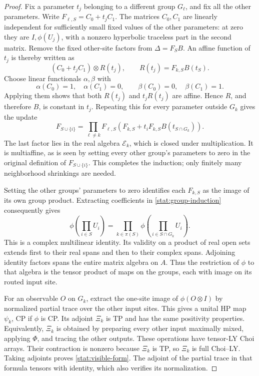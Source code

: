 \documentclass[reqno]{amsart}
\theoremstyle{definition}
\theoremstyle{remark}
\begin{document}
\begin{proof}
Fix a parameter \(t_j\) belonging to a different group \(G_\ell\),
and fix all the other parameters.  Write
\(F_{\ell,S}=C_0+t_jC_1\).  The matrices \(C_0,C_1\) are
linearly independent for sufficiently small fixed values of the
other parameters: at zero they are \(I,\phi(U_j)\), with a
nonzero hyperbolic traceless part in the second matrix.
Remove the fixed other-site factors from \(\Delta=F_SB\).
An affine function of \(t_j\) is thereby written as
\[
 (C_0+t_jC_1)\otimes R(t_j),\qquad R(t_j)=F_{k,S}B(t_S).
\]
Choose linear functionals \(\alpha,\beta\) with
\[
 \alpha(C_0)=1,\quad\alpha(C_1)=0,\qquad
 \beta(C_0)=0,\quad\beta(C_1)=1.
\]
Applying them shows that both \(R(t_j)\) and \(t_jR(t_j)\) are
affine.  Hence \(R\), and therefore \(B\), is constant in
\(t_j\).  Repeating this for every parameter outside \(G_k\)
gives the update
\[
 F_{S\cup\{i\}}=
 \prod_{\ell\ne k}F_{\ell,S}
 \left(F_{k,S}+t_iF_{k,S}B(t_{S\cap G_k})\right).
\]
The last factor lies in the real algebra \(\mathcal E_k\), which
is closed under multiplication.  It is multiaffine, as is seen by
setting every other group's parameters to zero in the original
definition of \(F_{S\cup\{i\}}\).  This completes the induction;
only finitely many neighborhood shrinkings are needed.

Setting the other groups' parameters to zero identifies each
\(F_{k,S}\) as the image of its own group product.  Extracting
coefficients in \eqref{stat:group-induction} consequently gives
\[
 \phi\left(\prod_{i\in S}U_i\right)=
 \prod_{k\in\pi(S)}
 \phi\left(\prod_{i\in S\cap G_k}U_i\right).
\]
This is a complex multilinear identity.  Its validity on a product
of real open sets extends first to their real spans and then to their
complex spans.  Adjoining identity factors spans the entire matrix
algebra on \(A\).  Thus the restriction of \(\phi\) to that
algebra is the tensor product of maps on the groups, each with image
on its routed input site.

For an observable \(O\) on \(G_k\), extract the one-site image of
\(\phi(O\otimes I)\) by normalized partial trace over the other
input sites.  This gives a unital HP map \(\psi_k\), CP if
\(\phi\) is CP.  Its adjoint \(\Xi_k\) is TP and has the same
positivity properties.  Equivalently, \(\Xi_k\) is obtained by
preparing every other input maximally mixed, applying \(\Phi\),
and tracing the other outputs.  These operations have tensor-LY
Choi arrays.  Their contraction is nonzero because \(\Xi_k\) is
TP, so \(\Xi_k\) is full Choi--LY.  Taking adjoints proves
\eqref{stat:visible-form}.  The adjoint of the partial trace in
that formula tensors with identity, which also verifies its
normalization.
\end{proof}
\end{document}
